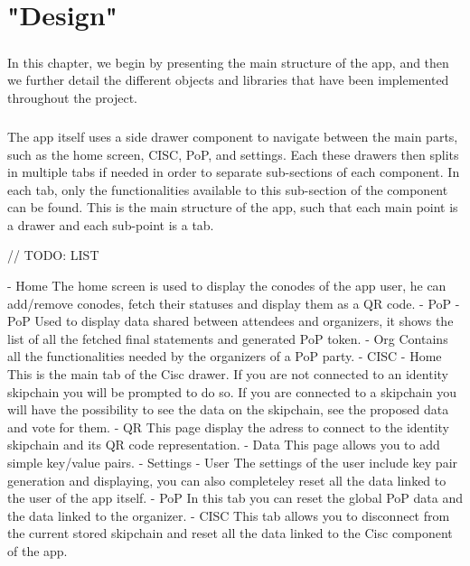\chapter{"Design"}

\paragraph{}
In this chapter, we begin by presenting the main structure of the app, and then we further detail the different objects and libraries that have been implemented throughout the project.

\paragraph{}
The app itself uses a side drawer component to navigate between the main parts, such as the home screen, CISC, PoP, and settings. Each these drawers then splits in multiple tabs if needed in order to separate sub-sections of each component. In each tab, only the functionalities available to this sub-section of the component can be found. This is the main structure of the app, such that each main point is a drawer and each sub-point is a tab.

// TODO: LIST

- Home
The home screen is used to display the conodes of the app user, he can add/remove conodes, fetch their statuses and display them as a QR code.
- PoP
  - PoP
  Used to display data shared between attendees and organizers, it shows the list of all the fetched final statements and generated PoP token.
  - Org
  Contains all the functionalities needed by the organizers of a PoP party.
- CISC
  - Home
  This is the main tab of the Cisc drawer. If you are not connected to an identity skipchain you will be prompted to do so. If you are connected to a skipchain you will have the possibility to see the data on the skipchain, see the proposed data and vote for them.
  - QR
  This page display the adress to connect to the identity skipchain and its QR code representation.
  - Data
  This page allows you to add simple key/value pairs.
- Settings
  - User
  The settings of the user include key pair generation and displaying, you can also completeley reset all the data linked to the user of the app itself.
  - PoP
  In this tab you can reset the global PoP data and the data linked to the organizer.
  - CISC
  This tab allows you to disconnect from the current stored skipchain and reset all the data linked to the Cisc component of the app.

